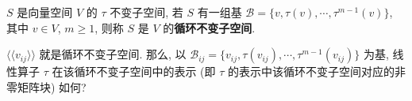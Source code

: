 \documentclass{note}
\begin{document}
\begin{df}[循环不变子空间]
    $S$ 是向量空间 $V$ 的 $\tau$ 不变子空间, 若 $S$ 有一组基 $\mathcal{B}=\{v,\tau(v),\cdots,\tau^{m-1}(v)\}$, 其中 $v\in V$, $m\geq 1$, 则称 $S$ 是 $V$ 的\textbf{循环不变子空间}.
\end{df}

$\langle\langle v_{ij}\rangle\rangle$ 就是循环不变子空间. 那么, 以 $\mathcal{B}_{ij}=\{v_{ij},\tau(v_{ij}),\cdots,\tau^{m-1}(v_{ij})\}$ 为基, 线性算子 $\tau$ 在该循环不变子空间中的表示 (即 $\tau$ 的表示中该循环不变子空间对应的非零矩阵块) 如何?

\end{document}
